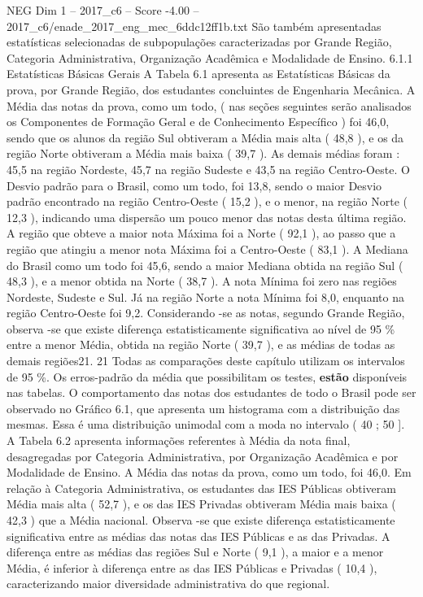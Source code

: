\begin{textsample}{NEG Dim 1 – 2017\_c6 – Score -4.00 – 2017\_c6/enade\_2017\_eng\_mec\_6ddc12ff1b.txt}
São também apresentadas estatísticas selecionadas de subpopulações caracterizadas por Grande Região, Categoria Administrativa, Organização Acadêmica e Modalidade de Ensino. 6.1.1 Estatísticas Básicas Gerais A Tabela 6.1 apresenta as Estatísticas Básicas da prova, por Grande Região, dos estudantes concluintes de Engenharia Mecânica.
A Média das notas da prova, como um todo, ( nas seções seguintes serão analisados os Componentes de Formação Geral e de Conhecimento Específico ) foi 46,0, sendo que os alunos da região Sul obtiveram a Média mais alta ( 48,8 ), e os da região Norte obtiveram a Média mais baixa ( 39,7 ).
As demais médias foram : 45,5 na região Nordeste, 45,7 na região Sudeste e 43,5 na região Centro-Oeste.
O Desvio padrão para o Brasil, como um todo, foi 13,8, sendo o maior Desvio padrão encontrado na região Centro-Oeste ( 15,2 ), e o menor, na região Norte ( 12,3 ), indicando uma dispersão um pouco menor das notas desta última região.
A região que obteve a maior nota Máxima foi a Norte ( 92,1 ), ao passo que a região que atingiu a menor nota Máxima foi a Centro-Oeste ( 83,1 ).
A Mediana do Brasil como um todo foi 45,6, sendo a maior Mediana obtida na região Sul ( 48,3 ), e a menor obtida na Norte ( 38,7 ).
A nota Mínima foi zero nas regiões Nordeste, Sudeste e Sul.
Já na região Norte a nota Mínima foi 8,0, enquanto na região Centro-Oeste foi 9,2.
Considerando -se as notas, segundo Grande Região, observa -se que existe diferença estatisticamente significativa ao nível de 95 \% entre a menor Média, obtida na região Norte ( 39,7 ), e as médias de todas as demais regiões21. 21 Todas as comparações deste capítulo utilizam os intervalos de 95 \%.
Os erros-padrão da média que possibilitam os testes, \textbf{estão} disponíveis nas tabelas.
O comportamento das notas dos estudantes de todo o Brasil pode ser observado no Gráfico 6.1, que apresenta um histograma com a distribuição das mesmas.
Essa é uma distribuição unimodal com a moda no intervalo ( 40 ; 50 ].
A Tabela 6.2 apresenta informações referentes à Média da nota final, desagregadas por Categoria Administrativa, por Organização Acadêmica e por Modalidade de Ensino.
A Média das notas da prova, como um todo, foi 46,0.
Em relação à Categoria Administrativa, os estudantes das IES Públicas obtiveram Média mais alta ( 52,7 ), e os das IES Privadas obtiveram Média mais baixa ( 42,3 ) que a Média nacional.
Observa -se que existe diferença estatisticamente significativa entre as médias das notas das IES Públicas e as das Privadas.
A diferença entre as médias das regiões Sul e Norte ( 9,1 ), a maior e a menor Média, é inferior à diferença entre as das IES Públicas e Privadas ( 10,4 ), caracterizando maior diversidade administrativa do que regional.

\end{textsample}
